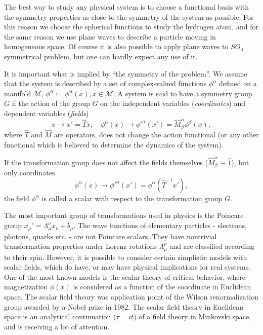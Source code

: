 \documentclass[a4paper,a4paper]{article}
\begin{document}
The best way to study any physical system is to choose a functional 
basis with the symmetry properties as close to the symmetry of the 
system as possible. For this reason we choose the spherical functions 
to study the hydrogen atom, and for the same reason we use plane waves 
to describe a particle moving in homogeneous space. Of course it is 
also possible to apply plane waves to $SO_3$ symmetrical problem, but 
one can hardly expect any use of it. 

It is important what is implied by ``the symmetry of the problem''. 
We assume that the system is described by a set of complex-valued 
functions $\phi^\alpha$ defined on a manifold $\mathcal{M}$,  
 $\phi^\alpha := \phi^\alpha(x), x \in \mathcal{M}$.
A system is said to have a symmetry group $G$ if the action of 
the group $G$ on the independent variables ({\em coordinates}) 
and dependent variables ({\em fields})
$$
x \to x' = \hat T x, \quad 
\phi^\alpha(x) \to {\phi'}^\alpha(x') = {\hat M}^\alpha_\beta \phi^\beta(x), 
$$
where $\hat T$ and $\hat M$ are operators, does not change the action 
functional
(or any other functional which is believed to determine the dynamics of 
the system). 

If the transformation group does not affect the fields themselves 
(${\hat M}^\alpha_\beta\equiv\hat 1$), but only coordinates
$$
\phi^\alpha(x) \to {\phi'}^\alpha(x') = \phi^\alpha({\hat T}^{-1}x'),
$$
the field $\phi^\alpha$ is called a scalar with respect to the 
transformation group $G$. 

The most important group of transformations used in physics is the 
Poincare group ${x_\mu}' = \Lambda_\mu^\nu x_\nu + b_\mu$. The wave 
functions of elementary particles - electrons, photons, quarks etc. - 
are not Poincare scalars. They have nontrivial transformation properties 
under Lorenz rotations $\Lambda_\mu^\nu$ and are classified according 
to their spin. However, it is possible to consider certain simplistic 
models with scalar fields, which do have, or may have physical implications 
for real systems. One of the most known models is the scalar theory of 
critical behavior, where magnetization $\phi(x)$ is considered as a 
function of the coordinate in Euclidean space. The scalar field theory 
was application point of the Wilson renormalization group awarded by a 
Nobel prize in 1982. The scalar field theory in Euclidean space 
is an analytical continuation ($\tau=it$) of a field theory in 
Minkovski space, and is receiving a lot of attention.
\end{document}
